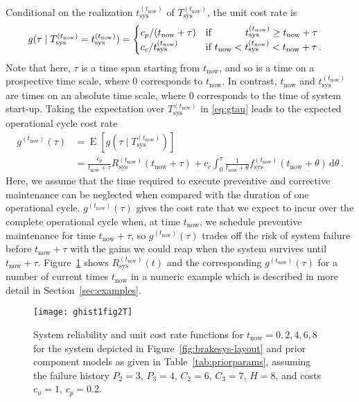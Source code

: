 \documentclass[authoryear]{elsarticle}
\newcommand{\dd}{\,\mathrm{d}}
\newcommand{\E}{\operatorname{E}}
\def\tnow{t_\text{now}}
\newcommand{\Rsysnow}{R^{(t_\text{now})}_\text{sys}}
\newcommand{\Tsysnow}{T^{(t_\text{now})}_\text{sys}}
\newcommand{\tsysnow}{t^{(t_\text{now})}_\text{sys}}
\newcommand{\fsysnow}{f^{(t_\text{now})}_\text{sys}}
\newcommand{\gnow}{g^{(\tnow)}}
\begin{document}
Conditional on the realization $\tsysnow$ of $\Tsysnow$, the unit cost rate is 
\begin{align}
g(\tau \mid \Tsysnow = \tsysnow) &=
\begin{cases}
c_p / (\tnow + \tau) & \text{if } \hspace{7.4ex} \tsysnow \ge \tnow + \tau \\
c_c /  \tsysnow      & \text{if }        \tnow < \tsysnow  <  \tnow + \tau \,.
\end{cases}
\label{eq:gtau}
\end{align}
Note that here, $\tau$ is a time span starting from $\tnow$,
and so is a time on a prospective time scale, where $0$ corresponds to $\tnow$.
In contrast, $\tnow$ and $\tsysnow$ are times on an absolute time scale,
where $0$ corresponds to the time of system start-up.
Taking the expectation over $\Tsysnow$ in \eqref{eq:gtau} leads to the expected operational cycle cost rate
\begin{align}
\gnow(\tau) &= \E[g(\tau \mid \Tsysnow)] \nonumber\\ 
            &= \frac{c_p}{\tnow + \tau} \Rsysnow(\tnow + \tau)
              + c_c \int_0^\tau \frac{1}{\tnow + \theta} \fsysnow(\tnow + \theta) \dd \theta\,.
\label{eq:gtnowtau}
\end{align}
Here, we assume that the time required to execute preventive and corrective maintenance
can be neglected when compared with the duration of one operational cycle.
%
$\gnow(\tau)$ gives the cost rate that we expect to incur over the complete operational cycle
when, at time $\tnow$, we schedule preventive maintenance for time $\tnow + \tau$,
so $\gnow(\tau)$ trades off the risk of system failure before $\tnow + \tau$
with the gains we could reap when the system survives until $\tnow + \tau$.
Figure~\ref{fig:ghist1fig2T} shows $\Rsysnow(t)$ and the corresponding $\gnow(\tau)$ for a number of current times $\tnow$
in a numeric example which is described in more detail in Section~\ref{sec:examples}.

\begin{figure}
\texttt{[image: ghist1fig2T]}
\caption{System reliability and unit cost rate functions for $\tnow = 0,2,4,6,8$
for the system depicted in Figure~\ref{fig:brakesys-layout}
and prior component models as given in Table~\ref{tab:priorparams},
assuming the failure history $P_2 = 3$, $P_3 = 4$, $C_2 = 6$, $C_3 = 7$, $H = 8$,
and costs $c_u = 1$, $c_p = 0.2$.}
\label{fig:ghist1fig2T}
\end{figure}
\end{document}
